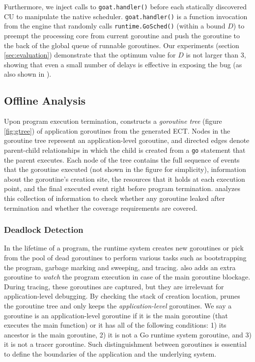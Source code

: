 Furthermore, we inject calls to \texttt{goat.handler()} before each statically discovered CU to manipulate the native scheduler. \texttt{goat.handler()} is a function invocation from the \goat engine that randomly calls \texttt{runtime.GoSched()} (within a bound $D$) to preempt the processing core from current goroutine and push the goroutine to the back of the global queue of runnable goroutines.
%
Our experiments (section \ref{sec:evaluation}) demonstrate that the optimum value for $D$ is not larger than 3, showing that even a small number of delays is effective in exposing the bug (as also shown in \cite{burckhardt-depthBug-asplos10}).

\subsection{Offline Analysis}
\label{sec:offline_analysis}
Upon program execution termination, \goat constructs a \textit{goroutine tree} (figure \ref{fig:gtree}) of application goroutines from the generated ECT.
%
Nodes in the goroutine tree represent an application-level goroutine, and directed edges denote parent-child relationships in which the child is created from a \texttt{go} statement that the parent executes.
%
Each node of the tree contains the full sequence of events that the goroutine executed (not shown in the figure for simplicity), information about the goroutine's creation site, the resources that it holds at each execution point, and the final executed event right before program termination.
%
\goat analyzes this collection of information to check whether any goroutine leaked after termination and whether the coverage requirements are covered.

\subsubsection{Deadlock Detection}
In the lifetime of a program, the runtime system creates new goroutines or pick from the pool of dead goroutines to perform various tasks such as bootstrapping the program, garbage marking and sweeping, and tracing.
%
\goat also adds an extra goroutine to \textit{watch} the program execution in case of the main goroutine blockage.
%
During tracing, these goroutines are captured, but they are irrelevant for application-level debugging.
%
By checking the stack of creation location, \goat prunes the goroutine tree and only keeps the \textit{application-level} goroutines.
%
We say a goroutine is an application-level goroutine if it is the main goroutine (that executes the main function) or it has all of the following conditions:
1) its ancestor is the main goroutine,
2) it is not a Go runtime system goroutine, and
3) it is not a tracer goroutine.
Such distinguishment between goroutines is essential to define the boundaries of the application and the underlying system.

